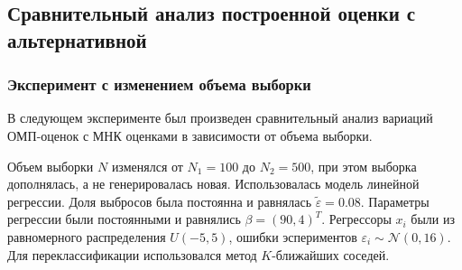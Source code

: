 \subsection{Сравнительный анализ построенной оценки с альтернативной}
\subsubsection{Эксперимент с изменением объема выборки}
В следующем эксперименте был произведен сравнительный анализ вариаций ОМП-оценок с МНК оценками в зависимости от объема выборки.

Объем выборки $N$ изменялся от $N_1=100$ до $N_2=500$, при этом выборка дополнялась, а не генерировалась новая. Использовалась модель линейной регрессии. Доля выбросов была постоянна и равнялась $\widetilde{\varepsilon}=0.08$. Параметры регрессии были постоянными и равнялись $\beta=(90,4)^T$. 
Регрессоры $x_i$ были из равномерного распределения $U(-5,5)$, ошибки эспериментов $\varepsilon_i\sim \mathcal{N}(0,16)$. Для переклассификации использовался метод $K$-ближайших соседей.

